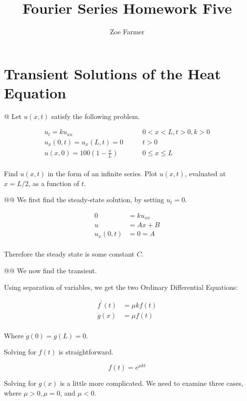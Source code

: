 \documentclass[10pt]{article}
\title{Fourier Series Homework Five}
\author{Zoe Farmer}
\begin{document}
\maketitle

\section{Transient Solutions of the Heat Equation}
\begin{easylist}[enumerate]
    @ Let $u(x, t)$ satisfy the following problem.

    \begin{align*}
        u_t = ku_{xx} \qquad & 0 < x < L, t > 0, k > 0\\
        u_x(0, t) = u_x(L, t) = 0 \qquad & t > 0\\
        u(x, 0) = 100 \left( 1 - \frac{x}{L} \right) \qquad & 0 \le x \le L\\
    \end{align*}

    Find $u(x, t)$ in the form of an infinite series. Plot $u(x, t)$, evaluated at $x = L / 2$, as a function of $t$.

    @@ We first find the steady-state solution, by setting $u_t = 0$.

    \begin{align*}
        0 &= ku_{xx}\\
        u &= Ax + B\\
        u_x(0, t) &= 0 = A\\
    \end{align*}

    Therefore the steady state is some constant $C$.

    @@ We now find the transient.

    Using separation of variables, we get the two Ordinary Differential Equations:

    \begin{align*}
        f^\prime(t) &= \mu k f(t)\\
        \ddot{g}(x) &= \mu f(t)\\
    \end{align*}

    Where $\dot{g}(0) = \dot{g}(L) = 0$.

    Solving for $f(t)$ is straightforward.

    \[
        f(t) = e^{\mu k t}
    \]

    Solving for $g(x)$ is a little more complicated. We need to examine three cases, where $\mu > 0, \mu = 0$, and
    $\mu < 0$.


\end{easylist}
\end{document}
